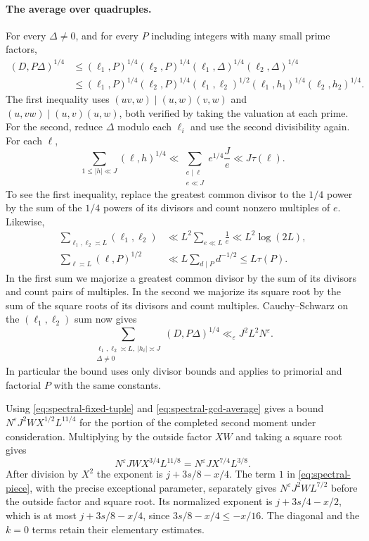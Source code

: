 \documentclass[11pt]{amsart}
\numberwithin{equation}{section}
\theoremstyle{remark}
\begin{document}
\paragraph{The average over quadruples.}
For every \(\Delta\ne0\), and for every \(P\) including integers
with many small prime factors,
\begin{align*}
 (D,P\Delta)^{1/4}
 &\le(\ell_1,P)^{1/4}(\ell_2,P)^{1/4}
       (\ell_1,\Delta)^{1/4}(\ell_2,\Delta)^{1/4}\\
 &\le(\ell_1,P)^{1/4}(\ell_2,P)^{1/4}
       (\ell_1,\ell_2)^{1/2}
       (\ell_1,h_1)^{1/4}(\ell_2,h_2)^{1/4}.
\end{align*}
The first inequality uses \((uv,w)\mid(u,w)(v,w)\) and
\((u,vw)\mid(u,v)(u,w)\), both verified by taking the valuation
at each prime. For the second, reduce \(\Delta\) modulo each
\(\ell_i\) and use the second divisibility again. For each \(\ell\),
\[
 \sum_{1\le |h|\ll J}(\ell,h)^{1/4}
 \ll\sum_{\substack{e\mid\ell\\ e\ll J}} e^{1/4}\frac{J}{e}
 \ll J\tau(\ell).
\]
To see the first inequality, replace the greatest common divisor
to the \(1/4\) power by the sum of the \(1/4\) powers of its divisors
and count nonzero multiples of \(e\).
Likewise,
\[
 \begin{aligned}
 \sum_{\ell_1,\ell_2\asymp L}(\ell_1,\ell_2)
 &\ll L^2\sum_{e\ll L}\frac1e\ll L^2\log(2L),\\
 \sum_{\ell\asymp L}(\ell,P)^{1/2}
 &\ll L\sum_{d\mid P}d^{-1/2}\le L\tau(P).
 \end{aligned}
\]
In the first sum we majorize a greatest common divisor by the sum
of its divisors and count pairs of multiples. In the second we
majorize its square root by the sum of the square roots of its divisors
and count multiples. Cauchy--Schwarz on the \((\ell_1,\ell_2)\) sum
now gives
\begin{equation}
 \sum_{\substack{\ell_1,\ell_2\asymp L,\ |h_i|\asymp J\\\Delta\ne0}}
 (D,P\Delta)^{1/4}
 \ll_\varepsilon J^2 L^2 N^\varepsilon.
 \label{eq:spectral-gcd-average}
\end{equation}
In particular the bound uses only divisor bounds and applies to
primorial and factorial \(P\) with the same constants.

Using \eqref{eq:spectral-fixed-tuple} and
\eqref{eq:spectral-gcd-average} gives a bound
\(N^\varepsilon J^2 W X^{1/2}L^{11/4}\) for the portion of
the completed second moment under consideration. Multiplying by
the outside factor \(XW\) and taking a square root gives
\[
 N^\varepsilon J W X^{3/4}L^{11/8}
   = N^\varepsilon J X^{7/4}L^{3/8}.
\]
After division by \(X^2\) the exponent is
\(j+3s/8-x/4\). The term \(1\) in
\eqref{eq:spectral-piece}, with the precise exceptional parameter,
separately gives \(N^\varepsilon J^2WL^{7/2}\) before the outside
factor and square root. Its normalized exponent is
\(j+3s/4-x/2\), which is at most \(j+3s/8-x/4\), since
\(3s/8-x/4\le-x/16\). The diagonal and the \(k=0\) terms
retain their elementary estimates.
\end{document}
